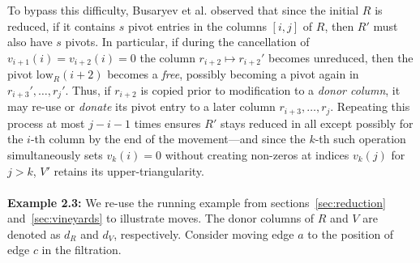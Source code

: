 \documentclass[sn-mathphys]{sn-jnl}
\begin{document}
To bypass this difficulty, Busaryev et al. observed that since the initial $R$ is reduced, if it contains $s$ pivot entries in the columns $[i,j]$ of $R$, then $R'$ must also have $s$ pivots. 
In particular, if during the cancellation  of $v_{i+1}(i) = v_{i+2}(i) = 0$ the column $r_{i+2} \mapsto r_{i+2}'$ becomes unreduced, then the pivot $\mathrm{low}_R(i+2)$ becomes a \emph{free}, possibly becoming a pivot again in $r_{i+3}', \dots, r_j'$.  
Thus, if $r_{i+2}$ is copied prior to modification to a \emph{donor column}, it may re-use or \emph{donate} its pivot entry to a later column $r_{i+3}, \dots, r_j$. 
Repeating this process at most $j - i - 1$ times ensures $R'$ stays reduced in all except possibly for the $i$-th column by the end of the movement---and since the $k$-th such operation simultaneously sets $v_{k}(i) = 0$ without creating non-zeros at indices $v_{k}(j)$ for $j > k$, $V'$ retains its upper-triangularity. 
\\
\\
\noindent \textbf{Example 2.3:} We re-use the running example from sections~\ref{sec:reduction} and~\ref{sec:vineyards} to illustrate moves. The donor columns of $R$ and $V$ are denoted as $d_R$ and $d_V$, respectively. Consider moving edge $a$ to the position of edge $c$ in the filtration. 
\end{document}
